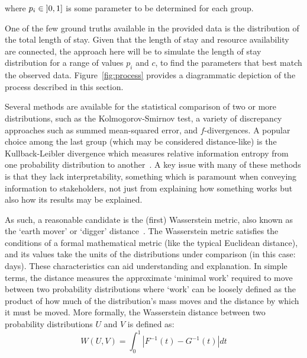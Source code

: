 \documentclass[11pt]{article}
\begin{document}
\noindent where \(p_i \in \interval[open left]{0}{1}\) is some parameter to be
determined for each group.

One of the few ground truths available in the provided data is the distribution
of the total length of stay. Given that the length of stay and resource
availability are connected, the approach here will be to simulate the length of
stay distribution for a range of values \(p_i\) and \(c\), to find the
parameters that best match the observed data. Figure~\ref{fig:process} provides
a diagrammatic depiction of the process described in this section.

Several methods are available for the statistical comparison of two or more
distributions, such as the Kolmogorov-Smirnov test, a variety of discrepancy
approaches such as summed mean-squared error, and \(f\)-divergences. A popular
choice among the last group (which may be considered distance-like) is the
Kullback-Leibler divergence which measures relative information entropy from one
probability distribution to another~\cite{Kullback1951}. A key issue with many
of these methods is that they lack interpretability, something which is
paramount when conveying information to stakeholders, not just from explaining
how something works but also how its results may be explained.

As such, a reasonable candidate is the (first) Wasserstein metric, also known as
the `earth mover' or `digger' distance~\cite{Vaserstein1969}. The Wasserstein
metric satisfies the conditions of a formal mathematical metric (like the
typical Euclidean distance), and its values take the units of the distributions
under comparison (in this case: days). These characteristics can aid
understanding and explanation. In simple terms, the distance measures the
approximate `minimal work' required to move between two probability
distributions where `work' can be loosely defined as the product of how much of
the distribution's mass moves and the distance by which it must be moved. More
formally, the Wasserstein distance between two probability distributions \(U\)
and \(V\) is defined as:
\begin{equation}\label{eq:wasserstein}
    W(U, V) = \int_{0}^{1} \left\vert F^{-1}(t) - G^{-1}(t) \right\vert dt
\end{equation}
\end{document}

